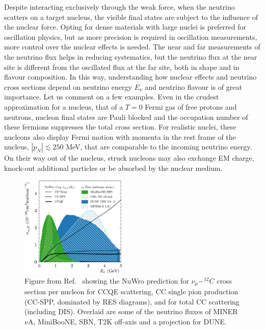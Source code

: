 Despite interacting exclusively through the weak force, when the neutrino scatters on a target nucleus, the visible final states are subject to the influence of the nuclear force. Opting for dense materials with large nuclei is preferred for oscillation physics, but as more precision is required in oscillation measurements, more control over the nuclear effects is needed. The near and far measurements of the neutrino flux helps in reducing systematics, but the neutrino flux at the near site is different from the oscillated flux at the far site, both in shape and in flavour composition. In this way, understanding how nuclear effects and neutrino cross sections depend on neutrino energy $E_\nu$ and neutrino flavour is of great importance. Let us comment on a few examples. Even in the crudest approximation for a nucleus, that of a $T=0$ Fermi gas of free protons and neutrons, nucleon final states are Pauli blocked and the occupation number of these fermions suppresses the total cross section. For realistic nuclei, these nucleons also display Fermi motion with momenta in the rest frame of the nucleus, $|p_N| \lesssim 250$ MeV, that are comparable to the incoming neutrino energy. On their way out of the nucleus, struck nucleons may also exchange EM charge, knock-out additional particles or be absorbed by the nuclear medium. 
%
\begin{figure}[t]
\centering
\includegraphics[width=0.45\textwidth]{cross_sections.jpg}
  \caption[Neutrino cross sections and the neutrino flux of current and future accelerator experiments.]{Figure from Ref.~\cite{Betancourt:2018bpu} showing the NuWro prediction for $\nu_\mu-^{12}C$ cross section per nucleon for {CCQE} scattering, CC single pion production (CC-SPP, dominated by {RES} diagrams), and for total CC scattering (including {DIS}). Overlaid are some of the neutrino fluxes of MINER$\nu$A, MiniBooNE, SBN, T2K off-axis and a projection for DUNE. \label{fig:compare_cross_sections}}
\end{figure}
